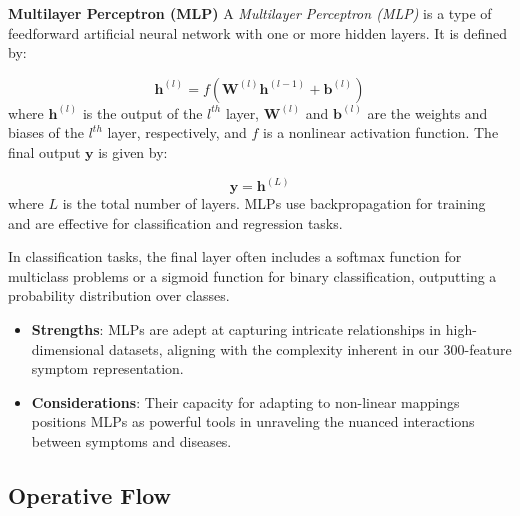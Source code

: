 \noindent
\textbf{Multilayer Perceptron (MLP)}\vspace{0.15cm}
A \textit{Multilayer Perceptron (MLP)} is a type of feedforward artificial neural network with one or more hidden layers. It is defined by:

\begin{equation}
    \mathbf{h}^{(l)} = f(\mathbf{W}^{(l)} \mathbf{h}^{(l-1)} + \mathbf{b}^{(l)})
\end{equation}
\noindent
where $\mathbf{h}^{(l)}$ is the output of the $l^{th}$ layer, $\mathbf{W}^{(l)}$ and $\mathbf{b}^{(l)}$ are the weights and biases of the $l^{th}$ layer, respectively, and $f$ is a nonlinear activation function. The final output $\mathbf{y}$ is given by:

\begin{equation}
    \mathbf{y} = \mathbf{h}^{(L)}
\end{equation}
\noindent
where $L$ is the total number of layers. MLPs use backpropagation for training and are effective for classification and regression tasks.

In classification tasks, the final layer often includes a softmax function for multiclass problems or a sigmoid function for binary classification, outputting a probability distribution over classes.

\begin{itemize}
	\item \textbf{Strengths}: MLPs are adept at capturing intricate relationships in high-dimensional datasets,
	      aligning with the complexity inherent in our 300-feature symptom representation.
	\item \textbf{Considerations}: Their capacity for adapting to non-linear mappings positions MLPs as powerful
	      tools in unraveling the nuanced interactions between symptoms and diseases.
\end{itemize}




\subsection{Operative Flow}

